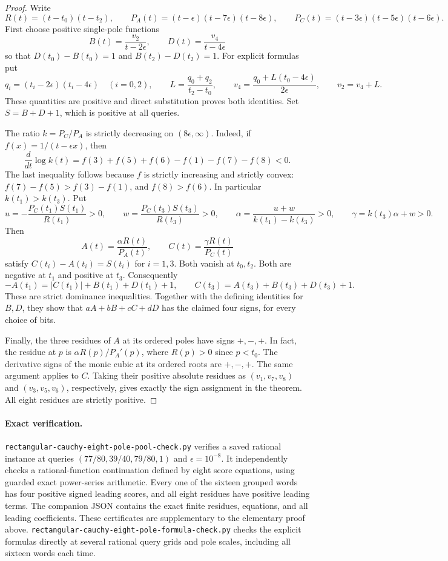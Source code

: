 \documentclass[11pt]{article}
\begin{document}
\begin{proof}
Write
\[
 R(t)=(t-t_0)(t-t_2),\qquad
 P_A(t)=(t-\epsilon)(t-7\epsilon)(t-8\epsilon),\qquad
 P_C(t)=(t-3\epsilon)(t-5\epsilon)(t-6\epsilon).
\]
First choose positive single-pole functions
\[
 B(t)=\frac{v_2}{t-2\epsilon},\qquad
 D(t)=\frac{v_4}{t-4\epsilon}
\]
so that $D(t_0)-B(t_0)=1$ and $B(t_2)-D(t_2)=1$.
For explicit formulas put
\[
 q_i=(t_i-2\epsilon)(t_i-4\epsilon)\quad(i=0,2),\qquad
 L=\frac{q_0+q_2}{t_2-t_0},\qquad
 v_4=\frac{q_0+L(t_0-4\epsilon)}{2\epsilon},\qquad v_2=v_4+L.
\]
These quantities are positive and direct substitution proves both
identities. Set $S=B+D+1$, which is positive at all queries.

The ratio $k=P_C/P_A$ is strictly decreasing on $(8\epsilon,\infty)$.
Indeed, if $f(x)=1/(t-\epsilon x)$, then
\[
 \frac{d}{dt}\log k(t)
   =f(3)+f(5)+f(6)-f(1)-f(7)-f(8)<0.
\]
The last inequality follows because $f$ is strictly increasing and
strictly convex: $f(7)-f(5)>f(3)-f(1)$, and $f(8)>f(6)$.
In particular $k(t_1)>k(t_3)$. Put
\[
 u=-\frac{P_C(t_1)S(t_1)}{R(t_1)}>0,\qquad
 w=\frac{P_C(t_3)S(t_3)}{R(t_3)}>0,\qquad
 \alpha=\frac{u+w}{k(t_1)-k(t_3)}>0,\qquad
 \gamma=k(t_3)\alpha+w>0.
\]
Then
\[
 A(t)=\frac{\alpha R(t)}{P_A(t)},\qquad
 C(t)=\frac{\gamma R(t)}{P_C(t)}
\]
satisfy $C(t_i)-A(t_i)=S(t_i)$ for $i=1,3$.
Both vanish at $t_0,t_2$. Both are negative at $t_1$ and positive at
$t_3$. Consequently
\[
 -A(t_1)=|C(t_1)|+B(t_1)+D(t_1)+1,
 \qquad
 C(t_3)=A(t_3)+B(t_3)+D(t_3)+1.
\]
These are strict dominance inequalities. Together with the defining
identities for $B,D$, they show that
$aA+bB+cC+dD$ has the claimed four signs, for every choice of bits.

Finally, the three residues of $A$ at its ordered poles have signs
$+,-,+$. In fact, the residue at $p$ is $\alpha R(p)/P_A'(p)$,
where $R(p)>0$ since $p<t_0$. The derivative signs of the monic
cubic at its ordered roots are $+,-,+$. The same argument applies
to $C$. Taking their positive absolute residues as
$(v_1,v_7,v_8)$ and $(v_3,v_5,v_6)$, respectively, gives exactly
the sign assignment in the theorem. All eight residues are strictly
positive.
\end{proof}

\paragraph{Exact verification.}
\texttt{rectangular-cauchy-eight-pole-pool-check.py} verifies a saved
rational instance at queries $(77/80,39/40,79/80,1)$ and
$\epsilon=10^{-8}$. It independently checks a rational-function
continuation defined by eight score equations, using guarded exact
power-series arithmetic. Every one of the sixteen grouped words has
four positive signed leading scores, and all eight residues have
positive leading terms. The companion JSON contains the exact finite
residues, equations, and all leading coefficients. These certificates
are supplementary to the elementary proof above.
\texttt{rectangular-cauchy-eight-pole-formula-check.py} checks the
explicit formulas directly at several rational query grids and pole
scales, including all sixteen words each time.
\end{document}

